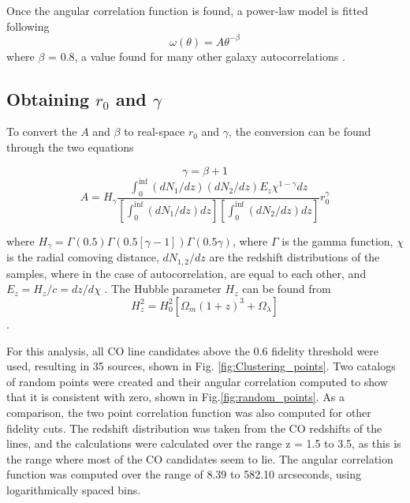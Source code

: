 Once the angular correlation function is found, a power-law model is fitted following $$\omega(\theta) = A\theta^{-\beta} $$ where $\beta$ = 0.8, a value found for many other galaxy autocorrelations \cite{hickox2011clustering}.

\subsection{Obtaining $r_0$ and $\gamma$}

To convert the $A$ and $\beta$ to real-space $r_0$ and $\gamma$, the conversion can be found through the two equations

$$ \gamma = \beta + 1 $$ $$ A = H_{\gamma}\frac{\int_{0}^{\inf} (dN_1/dz)(dN_2/dz)E_z\chi^{1 - \gamma} dz}{[\int_{0}^{\inf} (dN_1/dz)dz][\int_{0}^{\inf} (dN_2/dz)dz]}r_0^{\gamma}$$

where $H_{\gamma} = \Gamma(0.5)\Gamma(0.5[\gamma -1])\Gamma(0.5\gamma)$, where $\Gamma$ is the gamma function, $\chi$ is the radial comoving distance, $dN_{1,2}/dz$ are the redshift distributions of the samples, where in the case of autocorrelation, are equal to each other, and $E_z = H_z/c = dz/d\chi$ \cite{hickox2011clustering}. The Hubble parameter $H_z$ can be found from
$$H_z^2 = H_0^2[\Omega_m(1+z)^3 + \Omega_{\lambda}]$$ \cite{hickox2011clustering}.

For this analysis, all CO line candidates above the 0.6 fidelity threshold were used, resulting in 35 sources, shown in Fig. \ref{fig:Clustering_points}. Two catalogs of random points were created and their angular correlation computed to show that it is consistent with zero, shown in Fig.\ref{fig:random_points}. As a comparison, the two point correlation function was also computed for other fidelity cuts. The redshift distribution was taken from the CO redshifts of the lines, and the calculations were calculated over the range z = 1.5 to 3.5, as this is the range where most of the CO candidates seem to lie. The angular correlation function was computed over the range of 8.39 to 582.10 arcseconds, using logarithmically spaced bins. 

